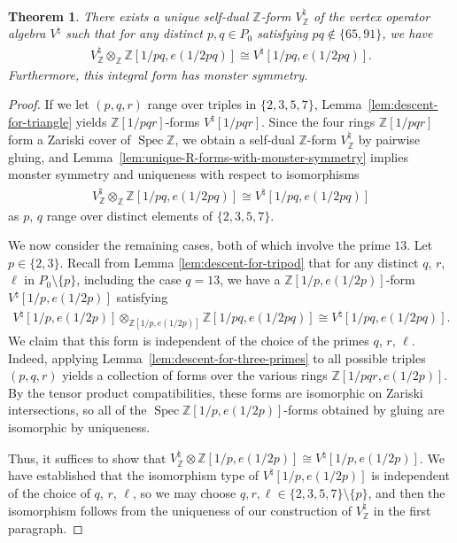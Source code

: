 \documentclass[pdftex]{sigma}
\newcommand{\bZ}{\mathbb{Z}}
\DeclareMathOperator{\Spec}{Spec}
\newtheorem{thm}{Theorem}[section]
\theoremstyle{definition}
\begin{document}
\begin{thm} \label{thm:integral-form-for-moonshine}There exists a unique self-dual $\bZ$-form $V^\natural_{\bZ}$ of the vertex operator algebra $V^\natural$ such that for any distinct $p,q \in P_0$ satisfying $pq \not\in \{65, 91\}$, we have
\begin{gather*} V^\natural_{\bZ} \otimes_{\bZ} \bZ[1/pq, e(1/2pq)] \cong V^\natural[1/pq, e(1/2pq)]. \end{gather*}
Furthermore, this integral form has monster symmetry.
\end{thm}
\begin{proof}If we let $(p,q,r)$ range over triples in $\{2,3,5,7\}$, Lemma~\ref{lem:descent-for-triangle} yields $\bZ[1/pqr]$-forms $V^\natural[1/pqr]$. Since the four rings $\bZ[1/pqr]$ form a Zariski cover of $\Spec \bZ$, we obtain a self-dual $\bZ$-form $V^\natural_\bZ$ by pairwise gluing, and Lemma~\ref{lem:unique-R-forms-with-monster-symmetry} implies monster symmetry and uniqueness with respect to isomorphisms
\begin{gather*} V^\natural_{\bZ} \otimes_{\bZ} \bZ[1/pq, e(1/2pq)] \cong V^\natural[1/pq, e(1/2pq)] \end{gather*}
as $p$, $q$ range over distinct elements of $\{2,3,5,7\}$.

We now consider the remaining cases, both of which involve the prime $13$. Let $p \in \{2,3\}$. Recall from Lemma \ref{lem:descent-for-tripod} that for any distinct $q$, $r$, $\ell$ in $P_0 \setminus \{p\}$, including the case $q=13$, we have a $\bZ[1/p,e(1/2p)]$-form $V^\natural[1/p, e(1/2p)]$ satisfying
\begin{gather*} V^\natural[1/p, e(1/2p)] \otimes_{\bZ[1/p, e(1/2p)]} \bZ[1/pq, e(1/2pq)] \cong V^\natural[1/pq, e(1/2pq)]. \end{gather*}
We claim that this form is independent of the choice of the primes $q$, $r$, $\ell$. Indeed, ap\-plying Lemma~\ref{lem:descent-for-three-primes} to all possible triples $(p,q,r)$ yields a collection of forms over the various rings $\bZ[1/pqr, e(1/2p)]$. By the tensor product compatibilities, these forms are isomorphic on Zariski intersections, so all of the $\Spec \bZ[1/p,e(1/2p)]$-forms obtained by gluing are isomorphic by uniqueness.

Thus, it suffices to show that $V^\natural_{\bZ} \otimes \bZ[1/p, e(1/2p)] \cong V^\natural[1/p, e(1/2p)]$. We have established that the isomorphism type of $V^\natural[1/p, e(1/2p)]$ is independent of the choice of $q$, $r$, $\ell$, so we may choose $q,r,\ell \in \{2,3,5,7\} \setminus \{p\}$, and then the isomorphism follows from the uniqueness of our construction of $V^\natural_{\bZ}$ in the first paragraph.
\end{proof}
\end{document}
